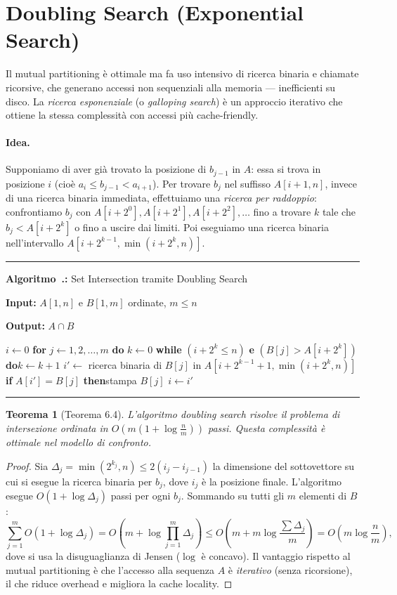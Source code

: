 \documentclass[12pt, a4paper, oneside]{book}
\newcounter{algocf}[chapter]
\renewcommand{\thealgocf}{\thechapter.\arabic{algocf}}
\newenvironment{algorithm}[1][H]{%
  \refstepcounter{algocf}%
  \par\medskip\noindent\rule{\linewidth}{0.4pt}\par\smallskip
}{%
  \par\smallskip\noindent\rule{\linewidth}{0.4pt}\par\medskip
}
\newcommand{\algcaption}[1]{\noindent\textbf{Algoritmo~\thealgocf:} #1\par\smallskip}
\newcommand{\KwIn}[1]{\noindent\textbf{Input:} #1\par}
\newcommand{\KwOut}[1]{\noindent\textbf{Output:} #1\par}
\newcommand{\For}[1]{\noindent\textbf{for} #1 \textbf{do}}
\newcommand{\While}[1]{\noindent\textbf{while} #1 \textbf{do}}
\newcommand{\If}[1]{\noindent\textbf{if} #1 \textbf{then}}
\theoremstyle{plain}
\newtheorem{teorema}{Teorema}[chapter]
\theoremstyle{definition}
\theoremstyle{remark}
\begin{document}
\section{Doubling Search (Exponential Search)}

Il mutual partitioning è ottimale ma fa uso intensivo di ricerca binaria e chiamate ricorsive, che generano accessi non sequenziali alla memoria --- inefficienti su disco. La \emph{ricerca esponenziale} (o \emph{galloping search}) è un approccio iterativo che ottiene la stessa complessità con accessi più cache-friendly.

\paragraph{Idea.} Supponiamo di aver già trovato la posizione di $b_{j-1}$ in $A$: essa si trova in posizione $i$ (cioè $a_i \le b_{j-1} < a_{i+1}$). Per trovare $b_j$ nel suffisso $A[i+1, n]$, invece di una ricerca binaria immediata, effettuiamo una \emph{ricerca per raddoppio}: confrontiamo $b_j$ con $A[i + 2^0], A[i + 2^1], A[i + 2^2], \ldots$ fino a trovare $k$ tale che $b_j < A[i + 2^k]$ o fino a uscire dai limiti. Poi eseguiamo una ricerca binaria nell'intervallo $A[i + 2^{k-1}, \min(i + 2^k, n)]$.

\begin{algorithm}[H]
\algcaption{Set Intersection tramite Doubling Search}
\KwIn{$A[1,n]$ e $B[1,m]$ ordinate, $m \le n$}
\KwOut{$A \cap B$}
$i \leftarrow 0$\;
\For{$j \leftarrow 1, 2, \ldots, m$}{
  $k \leftarrow 0$\;
  \While{$(i + 2^k \le n)$ \textbf{e} $(B[j] > A[i + 2^k])$}{$k \leftarrow k + 1$\;}
  $i' \leftarrow$ ricerca binaria di $B[j]$ in $A[i + 2^{k-1} + 1, \min(i + 2^k, n)]$\;
  \If{$A[i'] = B[j]$}{stampa $B[j]$\;}
  $i \leftarrow i'$\;
}
\end{algorithm}

\begin{teorema}[Teorema 6.4]
L'algoritmo doubling search risolve il problema di intersezione ordinata in $O\!\left(m\!\left(1 + \log\frac{n}{m}\right)\right)$ passi. Questa complessità è ottimale nel modello di confronto.
\end{teorema}

\begin{proof}
Sia $\Delta_j = \min(2^{k_j}, n) \le 2(i_j - i_{j-1})$ la dimensione del sottovettore su cui si esegue la ricerca binaria per $b_j$, dove $i_j$ è la posizione finale. L'algoritmo esegue $O(1 + \log \Delta_j)$ passi per ogni $b_j$. Sommando su tutti gli $m$ elementi di $B$:
\[
\sum_{j=1}^{m} O(1 + \log \Delta_j) = O\!\left(m + \log \prod_{j=1}^{m} \Delta_j\right) \le O\!\left(m + m \log \frac{\sum \Delta_j}{m}\right) = O\!\left(m \log \frac{n}{m}\right),
\]
dove si usa la disuguaglianza di Jensen ($\log$ è concavo). Il vantaggio rispetto al mutual partitioning è che l'accesso alla sequenza $A$ è \emph{iterativo} (senza ricorsione), il che riduce overhead e migliora la cache locality.
\end{proof}
\end{document}
